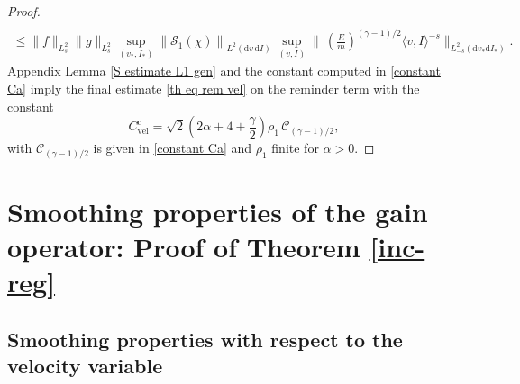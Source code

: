 \documentclass[11pt,a4paper]{amsart}
\newcommand{\mS}{\mathcal{S}}
\newcommand{\md}{\mathrm{d}}
\newcommand{\g}{\gamma}
\newcommand{\la}{\langle}
\newcommand{\ra}{\rangle}
\newcommand{\E}{\left(\frac{E}{m}\right)}
\newcommand{\cb}{\mathcal{C}}
\newcommand{\Ccmvel}{C_{\text{vel}}^{\text{c}}}
\begin{document}
\begin{proof}
\begin{multline*}
	\\ \leq
	\| f \|_{L^2_s}	\| g \|_{L^2_s}   \sup_{(v_*,I_*)} \left\| \mS_1(\chi)  \right\|_{L^2(\md v  \,\md I)}   \ \sup_{(v,I)}  \Big\| \    \E^{(\g-1)/2} \la v, I \ra^{-s}  \Big\|_{L^2_{-s}(\md v_* \md I_*)}.
\end{multline*}
Appendix Lemma \ref{S estimate L1 gen} and the constant computed in \eqref{constant Ca} imply the final estimate \eqref{th eq rem vel} on the reminder term with the constant
	\begin{equation*}
\Ccmvel=  \sqrt{2 } \left(2\alpha + 4 + \frac{\g}{2}\right)   \rho_1 \, \cb_{(\g -1)/2},
\end{equation*}
with  $\cb_{(\g -1)/2}$ is given in  \eqref{constant Ca} and $\rho_1$ finite for $\alpha>0$.
\end{proof}

\section{Smoothing properties of the gain operator: Proof of Theorem \ref{inc-reg}}

\subsection{Smoothing properties with respect to the velocity variable}\label{Sec: proof smooth v}
\end{document}
